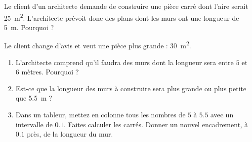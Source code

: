 
\begin{exercice}\label{exosmath-0962}

    Le client d'un architecte demande de construire une pièce carré dont l'aire serait \SI{25}{\meter\squared}. L'architecte prévoit donc des plans dont les murs ont une longueur de \SI{5}{\meter}. Pourquoi ?

    Le client change d'avis et veut une pièce plus grande : \SI{30}{\meter\squared}.
    \begin{enumerate}
        \item
            L'architecte comprend qu'il faudra des murs dont la longueur sera entre \( 5\) et \( 6\) mètres. Pourquoi ?
        \item
            Est-ce que la longueur des murs à construire sera plus grande ou plus petite que \SI{5.5}{\meter} ?
        \item
            Dans un tableur, mettez en colonne tous les nombres de \( 5\) à \( 5.5\) avec un intervalle de \( 0.1\). Faites calculer les carrés. Donner un nouvel encadrement, à \( 0.1\) près, de la longueur du mur.
    \end{enumerate}

\end{exercice}
